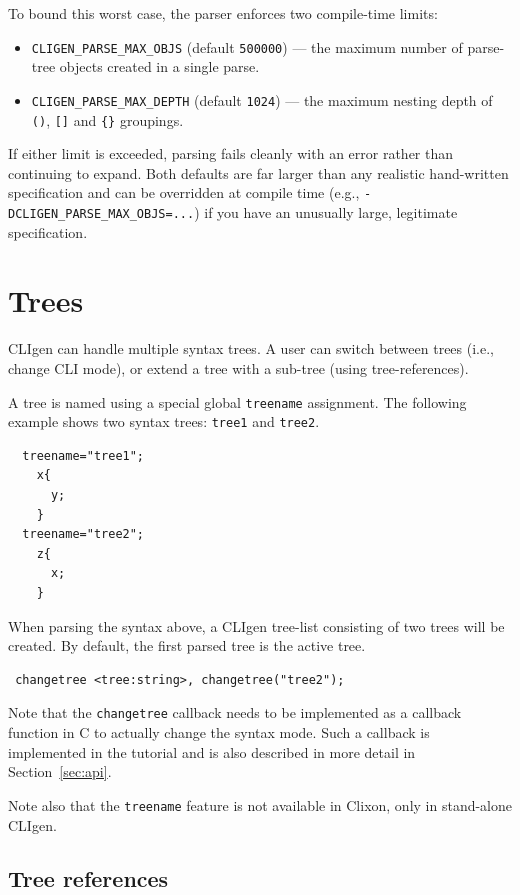 \documentclass[a4paper, 10pt] {article}
\begin{document}
To bound this worst case, the parser enforces two compile-time limits:
\begin{itemize}
\item {\tt CLIGEN\_PARSE\_MAX\_OBJS} (default {\tt 500000}) --- the maximum
  number of parse-tree objects created in a single parse.
\item {\tt CLIGEN\_PARSE\_MAX\_DEPTH} (default {\tt 1024}) --- the maximum
  nesting depth of {\tt ()}, {\tt []} and {\tt \{\}} groupings.
\end{itemize}
If either limit is exceeded, parsing fails cleanly with an error rather than
continuing to expand. Both defaults are far larger than any realistic
hand-written specification and can be overridden at compile time (e.g.,
{\tt -DCLIGEN\_PARSE\_MAX\_OBJS=...}) if you have an unusually large,
legitimate specification.

\section{Trees}
\label{sec:trees}

CLIgen can handle multiple syntax trees. A user can switch between
trees (i.e., change CLI mode), or extend a tree with a sub-tree (using
tree-references).

A tree is named using a special global {\tt treename} assignment. The
following example shows two syntax trees: {\tt tree1} and {\tt tree2}.
\begin{verbatim}
  treename="tree1";
    x{
      y;
    }
  treename="tree2";
    z{
      x;
    }
\end{verbatim}

When parsing the syntax above, a CLIgen tree-list consisting of two
trees will be created. By default, the first parsed tree is the active tree.

\begin{verbatim}
 changetree <tree:string>, changetree("tree2");
\end{verbatim}

Note that the {\tt changetree} callback needs to be implemented as a
callback function in C to actually change the syntax mode. Such a
callback is implemented in the tutorial and is also described in more
detail in Section~\ref{sec:api}.

Note also that the {\tt treename} feature is not available in Clixon, only in stand-alone CLIgen.

\subsection{Tree references}
\end{document}
